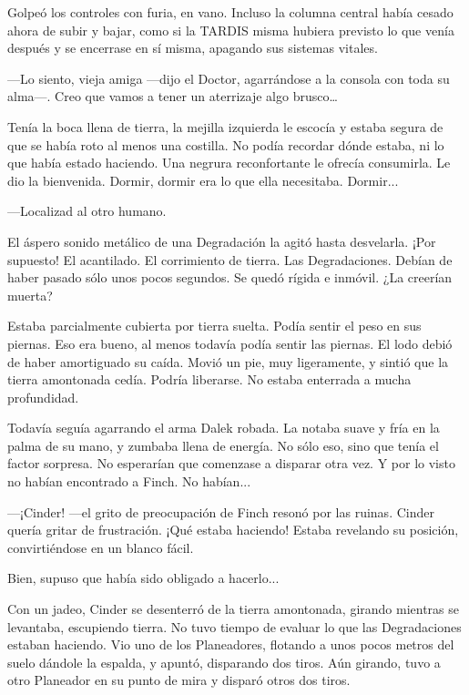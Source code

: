 Golpeó los controles con furia, en vano. Incluso la columna central había cesado ahora de subir y bajar, como si la TARDIS misma hubiera previsto lo que venía después y se encerrase en sí misma, apagando sus sistemas vitales. 



—Lo siento, vieja amiga —dijo el Doctor, agarrándose a la consola con toda su alma—. Creo que vamos a tener un aterrizaje algo brusco… 



Tenía la boca llena de tierra, la mejilla izquierda le escocía y estaba segura de que se había roto al menos una costilla. No podía recordar dónde estaba, ni lo que había estado haciendo. Una negrura reconfortante le ofrecía consumirla. Le dio la bienvenida. Dormir, dormir era lo que ella necesitaba. Dormir... 



—Localizad al otro humano. 



El áspero sonido metálico de una Degradación la agitó hasta desvelarla. ¡Por supuesto! El acantilado. El corrimiento de tierra. Las Degradaciones. Debían de haber pasado sólo unos pocos segundos. Se quedó rígida e inmóvil. ¿La creerían muerta? 

Estaba parcialmente cubierta por tierra suelta. Podía sentir el peso en sus piernas. Eso era bueno, al menos todavía podía sentir las piernas. El lodo debió de haber amortiguado su caída. Movió un pie, muy ligeramente, y sintió que la tierra amontonada cedía. Podría liberarse. No estaba enterrada a mucha profundidad. 

Todavía seguía agarrando el arma Dalek robada. La notaba suave y fría en la palma de su mano, y zumbaba llena de energía. No sólo eso, sino que tenía el factor sorpresa. No esperarían que comenzase a disparar otra vez. Y por lo visto no habían encontrado a Finch. No habían... 



—¡Cinder! —el grito de preocupación de Finch resonó por las ruinas. Cinder quería gritar de frustración. ¡Qué estaba haciendo! Estaba revelando su posición, convirtiéndose en un blanco fácil.

Bien, supuso que había sido obligado a hacerlo... 

Con un jadeo, Cinder se desenterró de la tierra amontonada, girando mientras se levantaba, escupiendo tierra. No tuvo tiempo de evaluar lo que las Degradaciones estaban haciendo. Vio uno de los Planeadores, flotando a unos pocos metros del suelo dándole la espalda, y apuntó, disparando dos tiros. Aún girando, tuvo a otro Planeador en su punto de mira y disparó otros dos tiros. 

